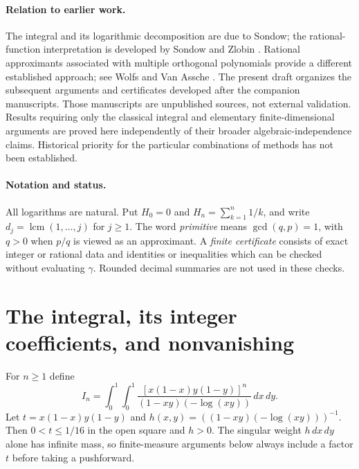 \documentclass[11pt,a4paper]{article}
\DeclareMathOperator{\lcm}{lcm}
\theoremstyle{definition}
\theoremstyle{remark}
\numberwithin{equation}{section}
\begin{document}
\paragraph{Relation to earlier work.}
The integral and its logarithmic decomposition are due to Sondow; the
rational-function interpretation is developed by Sondow and Zlobin
\cite{pm:Sondow2003,pm:SondowZlobin2004}.  Rational approximants associated with
multiple orthogonal polynomials provide a different established approach;
see Wolfs and Van Assche \cite{pm:WolfsVanAssche2025}.  The present draft
organizes the subsequent arguments and certificates developed after the
companion manuscripts.  Those manuscripts are unpublished sources, not
external validation.  Results requiring only the classical integral and
elementary finite-dimensional arguments are proved here independently of
their broader algebraic-independence claims.  Historical priority for the
particular combinations of methods has not been established.

\paragraph{Notation and status.}
All logarithms are natural.  Put $H_0=0$ and
$H_n=\sum_{k=1}^n1/k$, and write
$d_j=\lcm(1,\ldots,j)$ for $j\ge1$.  The word \emph{primitive} means
$\gcd(q,p)=1$, with $q>0$ when $p/q$ is viewed as an approximant.
A \emph{finite certificate} consists of exact integer or rational data
and identities or inequalities which can be checked without evaluating
$\gamma$.  Rounded decimal summaries are not used in these checks.

\section{The integral, its integer coefficients, and nonvanishing}
\label{pm:sec:setup}

For $n\ge1$ define
\begin{equation}\label{pm:eq:sondow-integral}
 I_n=\int_0^1\!\int_0^1
 \frac{[x(1-x)y(1-y)]^n}{(1-xy)(-\log(xy))}\,dx\,dy.
\end{equation}
Let $t=x(1-x)y(1-y)$ and
$h(x,y)=((1-xy)(-\log(xy)))^{-1}$.  Then $0<t\le1/16$ in the
open square and $h>0$.  The singular weight $h\,dx\,dy$ alone has
infinite mass, so finite-measure arguments below always include a factor
$t$ before taking a pushforward.
\end{document}
